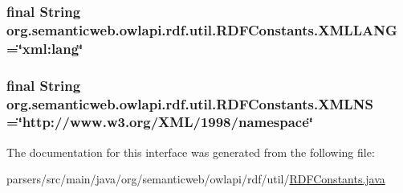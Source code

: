 \hypertarget{interfaceorg_1_1semanticweb_1_1owlapi_1_1rdf_1_1util_1_1_r_d_f_constants_a634281bcd76d08878ede58285fb11761}{
\subsubsection[{X\-M\-L\-L\-A\-N\-G}]{\setlength{\rightskip}{0pt plus 5cm}final String org.\-semanticweb.\-owlapi.\-rdf.\-util.\-R\-D\-F\-Constants.\-X\-M\-L\-L\-A\-N\-G =\char`\"{}xml\-:lang\char`\"{}}}\label{interfaceorg_1_1semanticweb_1_1owlapi_1_1rdf_1_1util_1_1_r_d_f_constants_a634281bcd76d08878ede58285fb11761}
\hypertarget{interfaceorg_1_1semanticweb_1_1owlapi_1_1rdf_1_1util_1_1_r_d_f_constants_af868d50a0e51fcafef24fefb459841d6}{
\subsubsection[{X\-M\-L\-N\-S}]{\setlength{\rightskip}{0pt plus 5cm}final String org.\-semanticweb.\-owlapi.\-rdf.\-util.\-R\-D\-F\-Constants.\-X\-M\-L\-N\-S =\char`\"{}http\-://www.\-w3.\-org/X\-M\-L/1998/namespace\char`\"{}}}\label{interfaceorg_1_1semanticweb_1_1owlapi_1_1rdf_1_1util_1_1_r_d_f_constants_af868d50a0e51fcafef24fefb459841d6}


The documentation for this interface was generated from the following file\-:\begin{DoxyCompactItemize}
\item 
parsers/src/main/java/org/semanticweb/owlapi/rdf/util/\hyperlink{_r_d_f_constants_8java}{R\-D\-F\-Constants.\-java}\end{DoxyCompactItemize}
